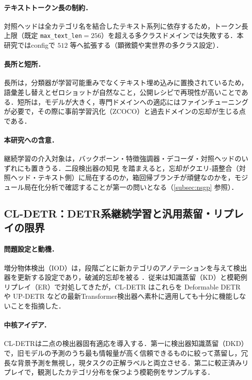 \paragraph{テキストトークン長の制約．}
対照ヘッドは全カテゴリ名を結合したテキスト系列に依存するため，トークン長上限（既定 \texttt{max\_text\_len}$=256$）を超える多クラスドメインでは失敗する．本研究ではconfigで $512$ 等へ拡張する（顕微鏡や実世界の多クラス設定）．

\paragraph{長所と短所．}
長所は，分類器が学習可能重みでなくテキスト埋め込みに置換されているため，語彙差し替えとゼロショットが自然なこと，公開レシピで再現性が高いことである．短所は，モデルが大きく，専門ドメインへの適応にはファインチューニングが必要で，その際に事前学習汎化（ZCOCO）と過去ドメインの忘却が生じる点である．

\paragraph{本研究への含意．}
継続学習の介入対象は，バックボーン・特徴強調器・デコーダ・対照ヘッドのいずれにも置きうる．二段検出器の知見 \cite{nsgp,redistill} を踏まえると，忘却がクエリ-語整合（対照ヘッド・テキスト側）に局在するのか，箱回帰ブランチが頑健なのかを，モジュール局在化分析で確認することが第一の問いとなる（\ref{subsec:nsgp} 参照）．


\subsection{CL-DETR：DETR系継続学習と汎用蒸留・リプレイの限界}
\label{subsec:cldetr}

\paragraph{問題設定と動機．}
増分物体検出（IOD）は，段階ごとに新カテゴリのアノテーションを与えて検出器を更新する設定であり，破滅的忘却を被る \cite{cldetr}．従来は知識蒸留（KD）と模範例リプレイ（ER）で対処してきたが，CL-DETR \cite{cldetr} はこれらを Deformable DETR や UP-DETR などの最新Transformer検出器へ素朴に適用しても十分に機能しないことを指摘した．

\paragraph{中核アイデア．}
CL-DETRは二点の検出器固有適応を導入する．第一に検出器知識蒸留（DKD）で，旧モデルの予測のうち最も情報量が高く信頼できるものに絞って蒸留し，冗長な背景予測を無視し，現タスクの正解ラベルと両立させる．第二に較正済みリプレイで，観測したカテゴリ分布を保つよう模範例をサンプルする．

